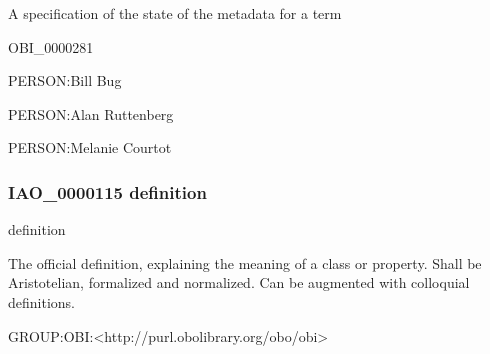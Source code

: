 \documentclass[letterpaper,10pt,english]{sphinxmanual}
\begin{document}
\begin{sphinxShadowBox}

\sphinxAtStartPar
A specification of the state of the metadata for a term
\end{sphinxShadowBox}

\begin{sphinxShadowBox}

\sphinxAtStartPar
OBI\_0000281
\end{sphinxShadowBox}

\begin{sphinxShadowBox}

\sphinxAtStartPar
PERSON:Bill Bug

\sphinxAtStartPar
PERSON:Alan Ruttenberg

\sphinxAtStartPar
PERSON:Melanie Courtot
\end{sphinxShadowBox}
\begin{quote}

\ignorespaces \end{quote}


\subsubsection{IAO\_0000115 \sphinxhyphen{} definition}
\label{\detokenize{doc-IAO_0000115:iao-0000115-definition}}\label{\detokenize{doc-IAO_0000115:index-0}}\label{\detokenize{doc-IAO_0000115::doc}}
\begin{sphinxShadowBox}

\sphinxAtStartPar
definition
\end{sphinxShadowBox}

\begin{sphinxShadowBox}

\sphinxAtStartPar
The official definition, explaining the meaning of a class or property. Shall be Aristotelian, formalized and normalized. Can be augmented with colloquial definitions.
\end{sphinxShadowBox}

\begin{sphinxShadowBox}

\sphinxAtStartPar
GROUP:OBI:\textless{}http://purl.obolibrary.org/obo/obi\textgreater{}
\end{sphinxShadowBox}
\end{document}
